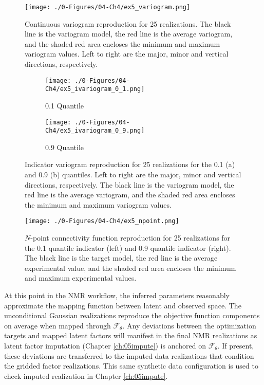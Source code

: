 \begin{figure}[htb!]
    \centering
    \texttt{[image: ./0-Figures/04-Ch4/ex5\_variogram.png]}
    \caption{Continuous variogram reproduction for 25 realizations. The black line is the variogram model, the red line is the average variogram, and the shaded red area encloses the minimum and maximum variogram values. Left to right are the major, minor and vertical directions, respectively.}
    \label{fig:ex5_variogram}
\end{figure}

\begin{figure}
    \begin{subfigure}{1.0\textwidth}
        \centering
        \texttt{[image: ./0-Figures/04-Ch4/ex5\_ivariogram\_0\_1.png]}
        \caption{0.1 Quantile}
    \end{subfigure}
    \begin{subfigure}{1.0\textwidth}
        \centering
        \texttt{[image: ./0-Figures/04-Ch4/ex5\_ivariogram\_0\_9.png]}
        \caption{0.9 Quantile}
    \end{subfigure}
    \caption{Indicator variogram reproduction for 25 realizations for the 0.1 (a) and 0.9 (b) quantiles. Left to right are the major, minor and vertical directions, respectively. The black line is the variogram model, the red line is the average variogram, and the shaded red area encloses the minimum and maximum variogram values.}
    \label{fig:ex5_ivariogram}
\end{figure}


\begin{figure}[htb!]
    \centering
    \texttt{[image: ./0-Figures/04-Ch4/ex5\_npoint.png]}
    \caption{$N$-point connectivity function reproduction for 25 realizations for the 0.1 quantile indicator (left) and 0.9 quantile indicator (right). The black line is the target model, the red line is the average experimental value, and the shaded red area encloses the minimum and maximum experimental values.}
    \label{fig:ex5_npoint}
\end{figure}

At this point in the \gls{NMR} workflow, the inferred parameters reasonably approximate the mapping function between latent and observed space. The unconditional Gaussian realizations reproduce the objective function components on average when mapped through $\mathcal{F}_{\theta}$. Any deviations between the optimization targets and mapped latent factors will manifest in the final \gls{NMR} realizations as latent factor imputation (Chapter \ref{ch:05impute}) is anchored on $\mathcal{F}_{\theta}$. If present, these deviations are transferred to the imputed data realizations that condition the gridded factor realizations. This same synthetic data configuration is used to check imputed realization in Chapter \ref{ch:05impute}.

